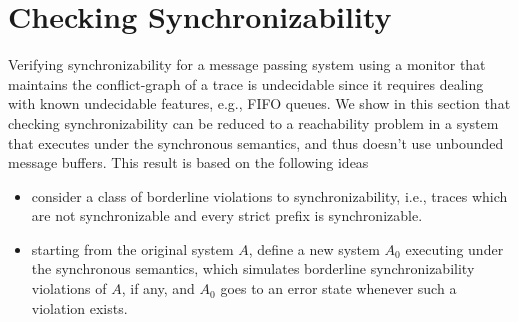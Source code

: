 \section{Checking Synchronizability}



Verifying synchronizability for a message passing system using a monitor that maintains the conflict-graph of a trace 
is undecidable since it requires dealing with known undecidable features, e.g., FIFO queues.
We show in this section that checking synchronizability can be reduced 
to a reachability problem in a system that executes under the synchronous semantics, and 
thus doesn't use unbounded message buffers. This result is based on the following ideas
\begin{itemize}
	\item consider a class of borderline violations to synchronizability, i.e., traces which
are not synchronizable and every strict prefix is synchronizable.
	\item starting from the original system $A$, define a new system $A_0$ executing under
the synchronous semantics, which simulates borderline synchronizability violations of
$A$, if any, and $A_0$ goes to an error state whenever such a violation exists.
\end{itemize}

